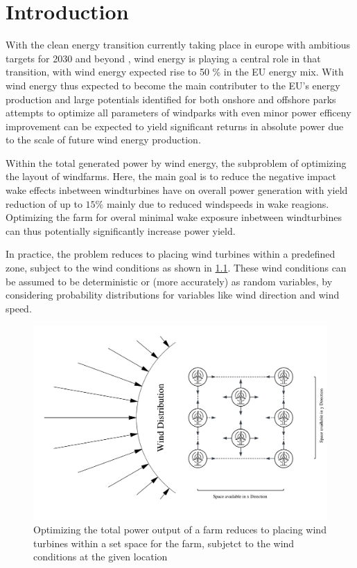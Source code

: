 
\chapter{Introduction}\label{chapter:introduction}


With the clean energy transition currently taking place in europe with ambitious targets for 2030 and beyond \cite{EU_RE_Targets_2023} , wind energy is playing a central role in that transition, with wind energy expected rise to 50 \% in the EU energy mix. \cite{ConsiliumEU_Harnessing_Wind_Power_2024}
With wind energy thus expected to become the main contributer to the EU's energy production and large potentials identified for both onshore and offshore parks \cite{EEA_Wind_Energy_Potential_2009} attempts to optimize all parameters of windparks with even minor power efficeny improvement can be expected to yield significant returns in absolute power due to the scale of future wind energy production. 

Within the total generated power by wind energy, the subproblem of optimizing the layout of windfarms. Here, the main goal is to reduce the negative impact wake effects inbetween windturbines have on overall power generation with yield reduction of up to $15 \%$  mainly due to reduced windspeeds in wake reagions. Optimizing the farm for overal minimal wake exposure inbetween windturbines can thus potentially significantly increase power yield. \cite{hou_review_2019} \cite{KIM2024123383} 

In practice, the problem reduces to placing wind turbines within a predefined zone, subject to the wind conditions as shown in \ref{fig:intro_plot}. These wind conditions can be assumed to be deterministic or (more accurately) as random variables, by considering probability distributions for variables like wind direction and wind speed.


\begin{figure}[h] 
	\centering
	\includegraphics[width=1\textwidth]{figures/introduction/intro_plot.png} 
	\caption{Optimizing the total power output of a farm reduces to placing wind turbines within a set space for the farm, subjetct to the wind conditions at the given location}
	\label{fig:intro_plot}
\end{figure}

